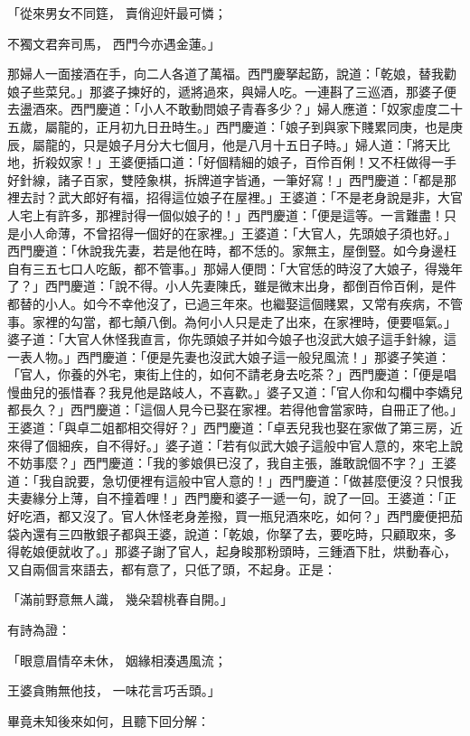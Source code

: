 \begin{showcontents}{}
「從來男女不同筳，  賣俏迎奸最可憐；

不獨文君奔司馬，  西門今亦遇金蓮。」

那婦人一面接酒在手，向二人各道了萬福。西門慶拏起筯，說道：「乾娘，替我勸娘子些菜兒。」那婆子揀好的，遞將過來，與婦人吃。一連斟了三巡酒，那婆子便去盪酒來。西門慶道：「小人不敢動問娘子青春多少？」婦人應道：「奴家虛度二十五歲，屬龍的，正月初九日丑時生。」西門慶道：「娘子到與家下賤累同庚，也是庚辰，屬龍的，只是娘子月分大七個月，他是八月十五日子時。」婦人道：「將天比地，折殺奴家！」王婆便插口道：「好個精細的娘子，百伶百俐！又不枉做得一手好針線，諸子百家，雙陸象棋，拆牌道字皆通，一筆好寫！」西門慶道：「都是那裡去討？武大郎好有福，招得這位娘子在屋裡。」王婆道：「不是老身說是非，大官人宅上有許多，那裡討得一個似娘子的！」西門慶道：「便是這等。一言難盡！只是小人命薄，不曾招得一個好的在家裡。」王婆道：「大官人，先頭娘子須也好。」西門慶道：「休說我先妻，若是他在時，都不恁的。家無主，屋倒豎。如今身邊枉自有三五七口人吃飯，都不管事。」那婦人便問：「大官恁的時沒了大娘子，得幾年了？」西門慶道：「說不得。小人先妻陳氏，雖是微末出身，都倒百伶百俐，是件都替的小人。如今不幸他沒了，已過三年來。也繼娶這個賤累，又常有疾病，不管事。家裡的勾當，都七顛八倒。為何小人只是走了出來，在家裡時，便要嘔氣。」婆子道：「大官人休怪我直言，你先頭娘子并如今娘子也沒武大娘子這手針線，這一表人物。」西門慶道：「便是先妻也沒武大娘子這一般兒風流！」那婆子笑道：「官人，你養的外宅，東街上住的，如何不請老身去吃茶？」西門慶道：「便是唱慢曲兒的張惜春？我見他是路岐人，不喜歡。」婆子又道：「官人你和勾欄中李嬌兒都長久？」西門慶道：「這個人見今已娶在家裡。若得他會當家時，自冊正了他。」王婆道：「與卓二姐都相交得好？」西門慶道：「卓丟兒我也娶在家做了第三房，近來得了個細疾，自不得好。」婆子道：「若有似武大娘子這般中官人意的，來宅上說不妨事麼？」西門慶道：「我的爹娘俱已沒了，我自主張，誰敢說個不字？」王婆道：「我自說要，急切便裡有這般中官人意的！」西門慶道：「做甚麼便沒？只恨我夫妻緣分上薄，自不撞着哩！」西門慶和婆子一遞一句，說了一回。王婆道：「正好吃酒，都又沒了。官人休怪老身差撥，買一瓶兒酒來吃，如何？」西門慶便把茄袋內還有三四散銀子都與王婆，說道：「乾娘，你拏了去，要吃時，只顧取來，多得乾娘便就收了。」那婆子謝了官人，起身睃那粉頭時，三鍾酒下肚，烘動春心，又自兩個言來語去，都有意了，只低了頭，不起身。正是：

「滿前野意無人識，  幾朵碧桃春自開。」

有詩為證：

「眼意眉情卒未休，  姻緣相湊遇風流；

王婆貪賄無他技，  一味花言巧舌頭。」

畢竟未知後來如何，且聽下回分解：





\end{showcontents}

